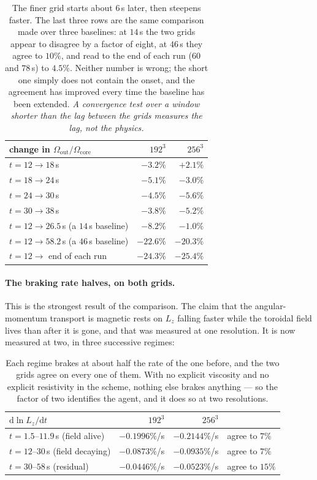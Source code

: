 \documentclass[11pt,a4paper]{article}
\begin{document}
\begin{table}[h]
\centering\small
\begin{tabular}{lrr}
\toprule
change in $\Omega_{\mathrm{out}}/\Omega_{\mathrm{core}}$ & $192^3$ & $256^3$ \\
\midrule
$t = 12 \to 18$\,s & $-3.2\%$ & $\mathbf{+2.1\%}$ \\
$t = 18 \to 24$\,s & $-5.1\%$ & $-3.0\%$ \\
$t = 24 \to 30$\,s & $-4.5\%$ & $\mathbf{-5.6\%}$ \\
$t = 30 \to 38$\,s & $-3.8\%$ & $\mathbf{-5.2\%}$ \\
\midrule
$t = 12 \to 26.5$\,s (a $14$\,s baseline) & $-8.2\%$ & $-1.0\%$ \\
$t = 12 \to 58.2$\,s (a $46$\,s baseline) & $-22.6\%$ & $-20.3\%$ \\
$t = 12 \to$ end of each run & $-24.3\%$ & $\mathbf{-25.4\%}$ \\
\bottomrule
\end{tabular}
\caption{The finer grid starts about $6$\,s later, then steepens faster. The
last three rows are the same comparison made over three baselines: at $14$\,s
the two grids appear to disagree by a factor of eight, at $46$\,s they agree to
$10\%$, and read to the end of each run ($60$ and $78$\,s) to $4.5\%$. Neither
number is wrong; the short one simply does not contain the onset, and the
agreement has improved every time the baseline has been extended. \emph{A convergence test over a window shorter than the lag between the
grids measures the lag, not the physics.}}
\label{tab:segments}
\end{table}

\paragraph{The braking rate halves, on both grids.} This is the strongest
result of the comparison. The claim that the angular-momentum transport is
magnetic rests on $L_z$ falling faster while the toroidal field lives than
after it is gone, and that was measured at one resolution. It is now measured
at two, in three successive regimes:

\begin{table}[h]
\centering\small
\begin{tabular}{lrrl}
\toprule
$\mathrm{d}\ln L_z/\mathrm{d}t$ & $192^3$ & $256^3$ & \\
\midrule
$t = 1.5$--$11.9$\,s \quad (field alive) & $-0.1996\%$/s & $-0.2144\%$/s & agree to $7\%$ \\
$t = 12$--$30$\,s \quad (field decaying) & $-0.0873\%$/s & $-0.0935\%$/s & agree to $7\%$ \\
$t = 30$--$58$\,s \quad (residual) & $-0.0446\%$/s & $-0.0523\%$/s & agree to $15\%$ \\
\bottomrule
\end{tabular}
\caption{Each regime brakes at about half the rate of the one before, and the
two grids agree on every one of them. With no explicit viscosity and no
explicit resistivity in the scheme, nothing else brakes anything --- so the
factor of two identifies the agent, and it does so at two resolutions.}
\label{tab:braking}
\end{table}
\end{document}
